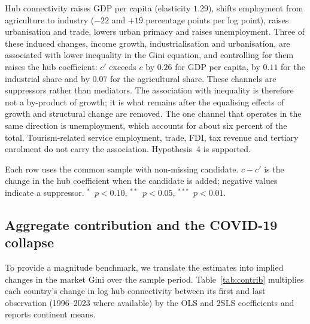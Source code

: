 \documentclass[12pt]{article}
\newcommand{\sym}[1]{\ensuremath{^{#1}}}
\begin{document}
Hub connectivity raises GDP per capita (elasticity $1.29$), shifts employment from agriculture to industry ($-22$ and $+19$ percentage points per log point), raises urbanisation and trade, lowers urban primacy and raises unemployment. Three of these induced changes, income growth, industrialisation and urbanisation, are associated with lower inequality in the Gini equation, and controlling for them raises the hub coefficient: $c'$ exceeds $c$ by $0.26$ for GDP per capita, by $0.11$ for the industrial share and by $0.07$ for the agricultural share. These channels are suppressors rather than mediators. The association with inequality is therefore not a by-product of growth; it is what remains after the equalising effects of growth and structural change are removed. The one channel that operates in the same direction is unemployment, which accounts for about six percent of the total. Tourism-related service employment, trade, FDI, tax revenue and tertiary enrolment do not carry the association. Hypothesis~4 is supported.

\begin{table}[H]\centering\caption{Mechanisms: induced changes and the residual association with the market Gini (2SLS, Feyrer instrument, robust SE).}\label{tab:mech}
\begin{threeparttable}\small
\begin{tablenotes}\footnotesize\item Each row uses the common sample with non-missing candidate. $c-c'$ is the change in the hub coefficient when the candidate is added; negative values indicate a suppressor. \sym{*}~$p<0.10$, \sym{**}~$p<0.05$, \sym{***}~$p<0.01$.\end{tablenotes}\end{threeparttable}\end{table}

\subsection{Aggregate contribution and the COVID-19 collapse}
\label{sec:contrib}
To provide a magnitude benchmark, we translate the estimates into implied changes in the market Gini over the sample period. Table~\ref{tab:contrib} multiplies each country's change in log hub connectivity between its first and last observation (1996--2023 where available) by the OLS and 2SLS coefficients and reports continent means.
\end{document}
